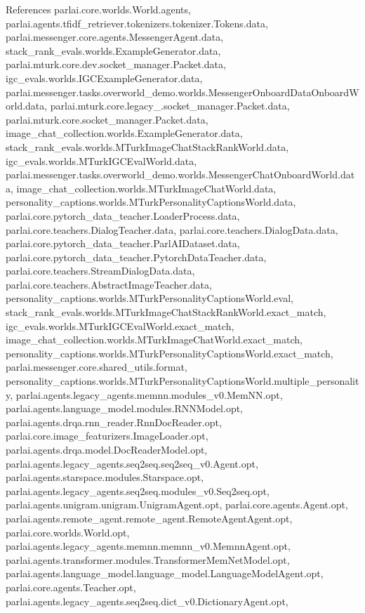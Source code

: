 References parlai.\+core.\+worlds.\+World.\+agents, parlai.\+agents.\+tfidf\+\_\+retriever.\+tokenizers.\+tokenizer.\+Tokens.\+data, parlai.\+messenger.\+core.\+agents.\+Messenger\+Agent.\+data, stack\+\_\+rank\+\_\+evals.\+worlds.\+Example\+Generator.\+data, parlai.\+mturk.\+core.\+dev.\+socket\+\_\+manager.\+Packet.\+data, igc\+\_\+evals.\+worlds.\+I\+G\+C\+Example\+Generator.\+data, parlai.\+messenger.\+tasks.\+overworld\+\_\+demo.\+worlds.\+Messenger\+Onboard\+Data\+Onboard\+World.\+data, parlai.\+mturk.\+core.\+legacy\+\_.\+socket\+\_\+manager.\+Packet.\+data, parlai.\+mturk.\+core.\+socket\+\_\+manager.\+Packet.\+data, image\+\_\+chat\+\_\+collection.\+worlds.\+Example\+Generator.\+data, stack\+\_\+rank\+\_\+evals.\+worlds.\+M\+Turk\+Image\+Chat\+Stack\+Rank\+World.\+data, igc\+\_\+evals.\+worlds.\+M\+Turk\+I\+G\+C\+Eval\+World.\+data, parlai.\+messenger.\+tasks.\+overworld\+\_\+demo.\+worlds.\+Messenger\+Chat\+Onboard\+World.\+data, image\+\_\+chat\+\_\+collection.\+worlds.\+M\+Turk\+Image\+Chat\+World.\+data, personality\+\_\+captions.\+worlds.\+M\+Turk\+Personality\+Captions\+World.\+data, parlai.\+core.\+pytorch\+\_\+data\+\_\+teacher.\+Loader\+Process.\+data, parlai.\+core.\+teachers.\+Dialog\+Teacher.\+data, parlai.\+core.\+teachers.\+Dialog\+Data.\+data, parlai.\+core.\+pytorch\+\_\+data\+\_\+teacher.\+Parl\+A\+I\+Dataset.\+data, parlai.\+core.\+pytorch\+\_\+data\+\_\+teacher.\+Pytorch\+Data\+Teacher.\+data, parlai.\+core.\+teachers.\+Stream\+Dialog\+Data.\+data, parlai.\+core.\+teachers.\+Abstract\+Image\+Teacher.\+data, personality\+\_\+captions.\+worlds.\+M\+Turk\+Personality\+Captions\+World.\+eval, stack\+\_\+rank\+\_\+evals.\+worlds.\+M\+Turk\+Image\+Chat\+Stack\+Rank\+World.\+exact\+\_\+match, igc\+\_\+evals.\+worlds.\+M\+Turk\+I\+G\+C\+Eval\+World.\+exact\+\_\+match, image\+\_\+chat\+\_\+collection.\+worlds.\+M\+Turk\+Image\+Chat\+World.\+exact\+\_\+match, personality\+\_\+captions.\+worlds.\+M\+Turk\+Personality\+Captions\+World.\+exact\+\_\+match, parlai.\+messenger.\+core.\+shared\+\_\+utils.\+format, personality\+\_\+captions.\+worlds.\+M\+Turk\+Personality\+Captions\+World.\+multiple\+\_\+personality, parlai.\+agents.\+legacy\+\_\+agents.\+memnn.\+modules\+\_\+v0.\+Mem\+N\+N.\+opt, parlai.\+agents.\+language\+\_\+model.\+modules.\+R\+N\+N\+Model.\+opt, parlai.\+agents.\+drqa.\+rnn\+\_\+reader.\+Rnn\+Doc\+Reader.\+opt, parlai.\+core.\+image\+\_\+featurizers.\+Image\+Loader.\+opt, parlai.\+agents.\+drqa.\+model.\+Doc\+Reader\+Model.\+opt, parlai.\+agents.\+legacy\+\_\+agents.\+seq2seq.\+seq2seq\+\_\+v0.\+Agent.\+opt, parlai.\+agents.\+starspace.\+modules.\+Starspace.\+opt, parlai.\+agents.\+legacy\+\_\+agents.\+seq2seq.\+modules\+\_\+v0.\+Seq2seq.\+opt, parlai.\+agents.\+unigram.\+unigram.\+Unigram\+Agent.\+opt, parlai.\+core.\+agents.\+Agent.\+opt, parlai.\+agents.\+remote\+\_\+agent.\+remote\+\_\+agent.\+Remote\+Agent\+Agent.\+opt, parlai.\+core.\+worlds.\+World.\+opt, parlai.\+agents.\+legacy\+\_\+agents.\+memnn.\+memnn\+\_\+v0.\+Memnn\+Agent.\+opt, parlai.\+agents.\+transformer.\+modules.\+Transformer\+Mem\+Net\+Model.\+opt, parlai.\+agents.\+language\+\_\+model.\+language\+\_\+model.\+Language\+Model\+Agent.\+opt, parlai.\+core.\+agents.\+Teacher.\+opt, parlai.\+agents.\+legacy\+\_\+agents.\+seq2seq.\+dict\+\_\+v0.\+Dictionary\+Agent.\+opt, 